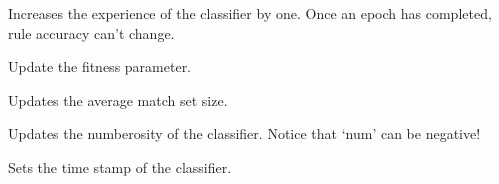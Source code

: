 \documentclass[letterpaper,10pt,english]{sphinxmanual}
\begin{document}
\begin{fulllineitems}

\begin{fulllineitems}
\label{\detokenize{eLCS:eLCS.Classifier.Classifier.updateExperience}}
Increases the experience of the classifier by one. Once an epoch has completed, rule accuracy can’t change.

\end{fulllineitems}


\begin{fulllineitems}
\label{\detokenize{eLCS:eLCS.Classifier.Classifier.updateFitness}}
Update the fitness parameter.

\end{fulllineitems}


\begin{fulllineitems}
\label{\detokenize{eLCS:eLCS.Classifier.Classifier.updateMatchSetSize}}
Updates the average match set size.

\end{fulllineitems}


\begin{fulllineitems}
\label{\detokenize{eLCS:eLCS.Classifier.Classifier.updateNumerosity}}
Updates the numberosity of the classifier.  Notice that ‘num’ can be negative!

\end{fulllineitems}


\begin{fulllineitems}
\label{\detokenize{eLCS:eLCS.Classifier.Classifier.updateTimeStamp}}
Sets the time stamp of the classifier.

\end{fulllineitems}


\end{fulllineitems}
\end{document}
